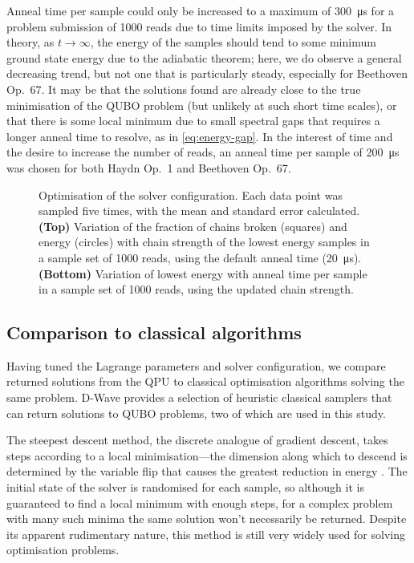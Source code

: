 \documentclass[12pt]{article}
\theoremstyle{definition}
\begin{document}
Anneal time per sample could only be increased to a maximum of \qty{300}{\us} for a problem submission of \num{1000} reads due to time limits imposed by the solver. In theory, as $t\to\infty$, the energy of the samples should tend to some minimum ground state energy due to the adiabatic theorem; here, we do observe a general decreasing trend, but not one that is particularly steady, especially for Beethoven Op.\ 67. It may be that the solutions found are already close to the true minimisation of the QUBO problem (but unlikely at such short time scales), or that there is some local minimum due to small spectral gaps that requires a longer anneal time to resolve, as in \cref{eq:energy-gap}. In the interest of time and the desire to increase the number of reads, an anneal time per sample of \qty{200}{\us} was chosen for both Haydn Op.\ 1 and Beethoven Op.\ 67.

\begin{figure}[ht]
    \centering\footnotesize
    
    \caption[Optimisation of the solver configuration.]{Optimisation of the solver configuration. Each data point was sampled five times, with the mean and standard error calculated. \textbf{(Top)} Variation of the fraction of chains broken (squares) and energy (circles) with chain strength of the lowest energy samples in a sample set of 1000 reads, using the default anneal time (\qty{20}{\us}).  \textbf{(Bottom)} Variation of lowest energy with anneal time per sample in a sample set of 1000 reads, using the updated chain strength.}
    \label{fig:solver-configuration}
\end{figure}

\subsection{Comparison to classical algorithms}

Having tuned the Lagrange parameters and solver configuration, we compare returned solutions from the QPU to classical optimisation algorithms solving the same problem. D-Wave provides a selection of heuristic classical samplers that can return solutions to QUBO problems, two of which are used in this study.

The steepest descent method, the discrete analogue of gradient descent, takes steps according to a local minimisation---the dimension along which to descend is determined by the variable flip that causes the greatest reduction in energy \cite{dwave_samplers}. The initial state of the solver is randomised for each sample, so although it is guaranteed to find a local minimum with enough steps, for a complex problem with many such minima the same solution won't necessarily be returned. Despite its apparent rudimentary nature, this method is still very widely used for solving optimisation problems.
\end{document}
